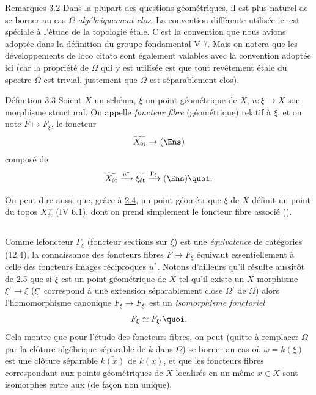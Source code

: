 \documentclass[10pt]{../fichiers-configuration-latex/smfart}
\begin{document}
\begin{enonce*}[remark]{Remarques 3.2}
Dans la plupart des questions géométriques, il est plus naturel de
se borner au cas $\Omega$ \emph{algébriquement clos}. La convention
différente utilisée ici est spéciale à l'étude de la topologie
étale. C'est la convention que nous avions adoptée dans la
définition du groupe fondamental  V 7. Mais on notera que les
développements de loco citato sont également valables avec la
convention adoptée ici (car la propriété de $\Omega$ qui y est
utilisée est que tout revêtement étale du spectre $\Omega$ est
trivial, \ie justement que $\Omega$ est séparablement clos).
\end{enonce*}

\begin{enonce*}{Définition 3.3}
Soient $X$ un schéma, $\xi$ un point géométrique de $X$, $u : \xi \to
X$ son morphisme structural. On appelle \emph{foncteur fibre} (géométrique)
relatif à $\xi$, et on note $F \mapsto F_{\xi}$, le foncteur
$$
\widetilde{X_{\text{\rm ét}}} \to (\Ens)
$$
composé de
$$
\widetilde{X_{\text{\rm ét}}} \xrightarrow{u^{\ast}}
\widetilde{\xi_{\text{\rm ét}}} \xrightarrow{\Gamma_{\xi}} (\Ens){\quoi}.
$$
\end{enonce*}

On peut dire aussi que, grâce à \hyperref[VIII.cor2.4]{2.4},
un point géométrique $\xi$ de $X$
définit un point du topos $X^{\sim}_{\text{ét}}$ (IV 6.1),
dont on prend  simplement le foncteur fibre associé (\loccit).

\setcounter{subsection}{3}
\subsection{}

Comme le\pageoriginale  foncteur $\Gamma_{\xi}$ (foncteur sections
sur $\xi$) est une \emph{équivalence} de catégories (12.4), la
connaissance des foncteurs fibres $F \mapsto F_{\xi}$ équivaut
essentiellement à celle des foncteurs images réciproques $u^{\ast}$.
Notons d'ailleurs qu'il résulte aussitôt de \hyperref[VIII.cor2.5]{2.5} que si
$\xi$ est un point géométrique de $X$ tel qu'il existe un
$X$-morphisme $\xi'\to \xi$ (\ie $\xi'$ correspond à une extension
séparablement close $\Omega'$ de $\Omega$) alors l'homomorphisme
canonique $F_{\xi} \to F_{\xi'}$ est un \emph{isomorphisme
fonctoriel}
$$
F_{\xi} \simeq F_{\xi'}{\quoi}.
$$
Cela montre que pour l'étude des foncteurs fibres, on peut (quitte à
remplacer $\Omega$ par la clôture algébrique séparable de $k$ dans
$\Omega$) se borner au cas où $\omega = k(\xi)$ est une clôture
séparable $\bar{k(x)}$ de $k(x)$, et que les foncteurs fibres
correspondant aux points géométriques de $X$ localisés en
un même $x
\in X$ sont isomorphes entre aux (de façon non unique).
\end{document}
